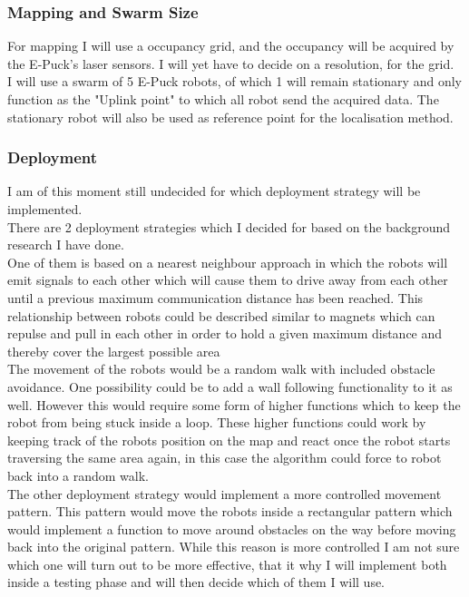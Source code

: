 \documentclass[10pt,a4paper]{article}
\begin{document}
\begin{flushleft}
\subsubsection{Mapping and Swarm Size}
For mapping I will use a occupancy grid, and the occupancy will be acquired by the E-Puck's laser sensors. 
I will yet have to decide on a resolution, for the grid.\\
I will use a swarm of 5 E-Puck robots, of which 1 will remain stationary and only function as the "Uplink point" to which all robot send the acquired data. 
The stationary robot will also be used as reference point for the localisation method.

\subsubsection{Deployment}
I am of this moment still undecided for which deployment strategy will be implemented. \\
There are 2 deployment strategies which I decided for based on the background research I have done.\\[3ex]

One of them is based on a nearest neighbour approach in which the robots will emit signals to each other which will cause them to drive away from each other until a previous maximum communication distance has been reached. This relationship between robots could be described similar to magnets which can repulse and pull in each other in order to hold a given maximum distance and thereby cover the largest possible area\\
The movement of the robots would be a random walk with included obstacle avoidance. One possibility could be to add a wall following functionality to it as well. However this would require some form of higher functions which to keep the robot from being stuck inside a loop. These higher functions could work by keeping track of the robots position on the map and react once the robot starts traversing the same area again, in this case the algorithm could force to robot back into a random walk.\\[3ex]

The other deployment strategy would implement a more controlled movement pattern. This pattern would move the robots inside a rectangular pattern which would implement a function to move around obstacles on the way before moving back into the original pattern. 
While this reason is more controlled I am not sure which one will turn out to be more effective, that it why I will implement both inside a testing phase and will then decide which of them I will use.


\end{flushleft}
\end{document}
